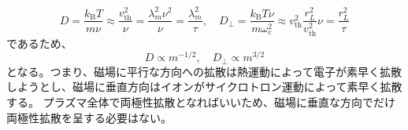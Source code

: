 \begin{equation}
	D = \frac{k_{\text{B}}T}{m\nu} \approx \frac{v^2_{\text{th}}}{\nu} = \frac{\lambda_m^2\nu^2}{\nu} = \frac{\lambda^2_m}{\tau},
	\quad{}D_{\perp} = \frac{k_{\text{B}}T\nu}{m\omega^2_c} \approx v^2_{\text{th}}\frac{r_L^2}{v_{\text{th}}^2}\nu = \frac{r_L^2}{\tau}
\end{equation}
であるため、
\begin{equation}
	D\propto m^{-1/2},\quad{}D_{\perp}\propto{}m^{3/2}
\end{equation}
となる。つまり、磁場に平行な方向への拡散は熱運動によって電子が素早く拡散しようとし、磁場に垂直方向はイオンがサイクロトロン運動によって素早く拡散する。
プラズマ全体で両極性拡散となればいいため、磁場に垂直な方向でだけ両極性拡散を呈する必要はない。




